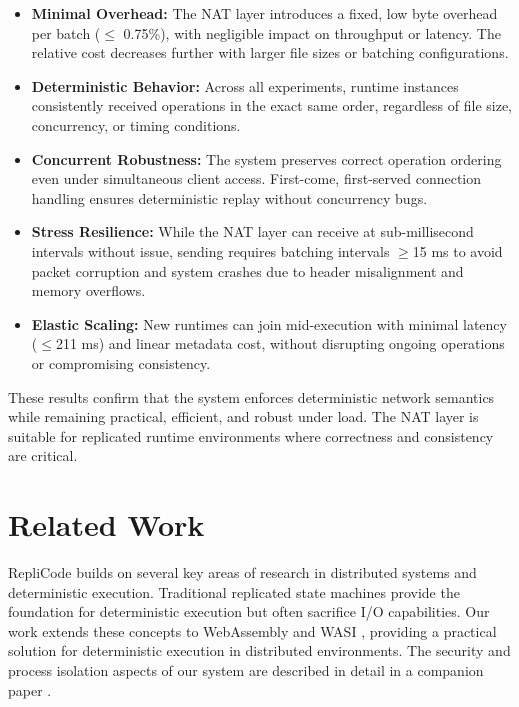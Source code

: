 \documentclass[10pt, 
]{IEEEtran}
\begin{document}
\begin{itemize}
    \item \textbf{Minimal Overhead:} The NAT layer introduces a fixed, low byte overhead per batch ($\leq$ 0.75\%), with negligible impact on throughput or latency. The relative cost decreases further with larger file sizes or batching configurations.
    
    \item \textbf{Deterministic Behavior:} Across all experiments, runtime instances consistently received operations in the exact same order, regardless of file size, concurrency, or timing conditions.
    
    \item \textbf{Concurrent Robustness:} The system preserves correct operation ordering even under simultaneous client access. First-come, first-served connection handling ensures deterministic replay without concurrency bugs.
    
    \item \textbf{Stress Resilience:} While the NAT layer can receive at sub-millisecond intervals without issue, sending requires batching intervals $\geq$15 ms to avoid packet corruption and system crashes due to header misalignment and memory overflows.
    
    \item \textbf{Elastic Scaling:} New runtimes can join mid-execution with minimal latency ($\leq$211 ms) and linear metadata cost, without disrupting ongoing operations or compromising consistency.
\end{itemize}

These results confirm that the system enforces deterministic network semantics while remaining practical, efficient, and robust under load. The NAT layer is suitable for replicated runtime environments where correctness and consistency are critical.

\section{Related Work}
RepliCode builds on several key areas of research in distributed systems and deterministic execution. Traditional replicated state machines \cite{deterministic2010} provide the foundation for deterministic execution but often sacrifice I/O capabilities. Our work extends these concepts to WebAssembly \cite{wasm2017} and WASI \cite{wasi2023}, providing a practical solution for deterministic execution in distributed environments. The security and process isolation aspects of our system are described in detail in a companion paper \cite{replicode2025}.
\end{document}
